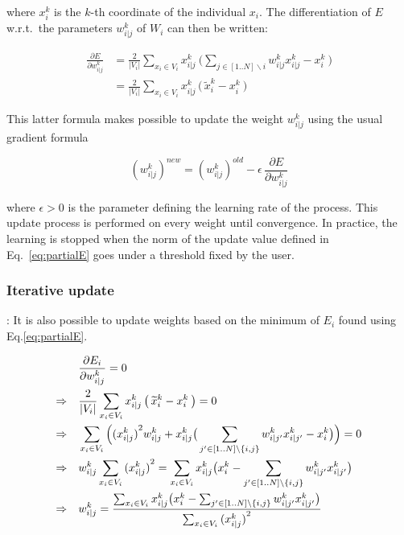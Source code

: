 where $x_i^k$ is the $k$-th coordinate of the individual $x_i$. The differentiation of $E$ w.r.t.\ the parameters $w_{i|j}^k$ of $W_i$ can then be written:
		
		\begin{align}
\label{eq:partialE}
            \frac{\partial E}{\partial w_{i|j}^k} &= \frac{2}{|V_i|}\sum_{x_i
            \in V_i} x_{i|j}^k \: \big(\sum_{j \in [1..N] \backslash i}
            w_{i|j}^k x_{i|j}^k - x_i^k\:\big) \nonumber \\
			&= \frac{2}{|V_i|}\sum_{x_i \in V_i} x_{i|j}^k \, \big(\,\widetilde{x}_i^k - x_i^k\:\big)
		\end{align}
		
		This latter formula makes possible to update the weight $w_{i|j}^k$ using the usual gradient formula
		
		\begin{equation}
            {(w_{i|j}^k)}^{new} = {(w_{i|j}^k)}^{old} - \epsilon \, \frac{\partial E}{\partial w_{i|j}^k}
		\end{equation}
		
		where $\epsilon > 0$ is the parameter defining the learning rate of the process. This update process is performed on every weight until convergence. In practice, the learning is stopped when the norm of the update value defined in Eq.~\ref{eq:partialE} goes under a threshold fixed by the user. 
		
		\subsubsection{Iterative update}:
It is also possible to update weights based on the minimum of $E_i$ found using
Eq.\ref{eq:partialE}.
		
		\begin{align}
\label{eq:partialE0}
            &\frac{\partial E_i}{\partial w_{i|j}^k} = 0\notag\\
            \Rightarrow\quad &\frac{2}{|V_i|}\sum_{x_i \in V_i} x_{i|j}^k \,
            \big(\,\widetilde{x}_i^k - x_i^k\:\big) = 0\notag\\
            \Rightarrow\quad &\sum_{x_i \in V_i}
            \Big({(x_{i|j}^k)}^2w_{i|j}^k+x_{i|j}^k\big(\sum_{j'\in[1..N]\backslash
            \{i,j\}} w_{i|j'}^k x_{i|j'}^k - x_i^k \big)\Big) = 0\notag\\
            \Rightarrow \quad & w_{i|j}^k \sum_{x_i \in V_i}{(x_{i|j}^k)}^2
            = \sum_{x_i \in V_i} x_{i|j}^k\big(x_i^k -
            \sum_{j'\in[1..N]\backslash \{i,j\}} w_{i|j'}^k x_{i|j'}^k
            \big)\notag\\
            \Rightarrow \quad & w_{i|j}^k = \frac{\sum_{x_i \in V_i}
            x_{i|j}^k\big(x_i^k - \sum_{j'\in[1..N]\backslash \{i,j\}}
            w_{i|j'}^k x_{i|j'}^k \big)}{\sum_{x_i \in V_i}{(x_{i|j}^k)}^2}
		\end{align}
		
